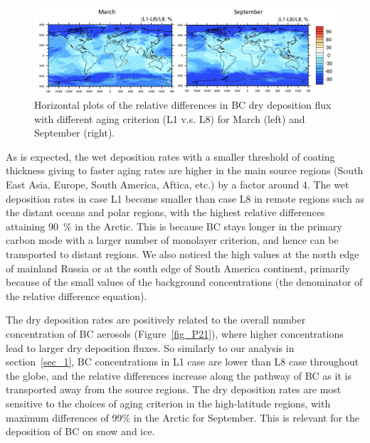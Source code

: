 \documentclass[12pt, fullpage]{uiucthesis2009_2}
\begin{document}
	
	\begin{figure}[h] 
		\begin{center}
			\includegraphics[width = 1\textwidth]{Figure18}
			\caption[Horizontal plots of the relative differences in BC dry deposition flux with different aging criterion (L1 v.s. L8) for March (left) and September (right)]{\label{fig_P18} Horizontal plots of the relative differences in BC dry deposition flux with different aging criterion (L1 v.s. L8) for March (left) and September (right).}
		\end{center}
	\end{figure}
	
	As is expected, the wet deposition rates with a smaller threshold of coating thickness giving to faster aging rates are higher in the main source regions (South East Asia, Europe, South America, Aftica, etc.) by a factor around 4. The wet deposition rates in case L1 become smaller than case L8 in remote regions such as the distant oceans and polar regions, with the highest relative differences attaining 90~$\%$ in the Arctic. This is because BC stays longer in the primary carbon mode with a larger number of monolayer criterion, and hence can be transported to distant regions. We also noticed the high values at the north edge of mainland Russia or at the south edge of South America continent, primarily because of the small values of the background concentrations (the denominator of the relative difference equation).
	
	The dry deposition rates are positively related to the overall number concentration of BC aerosols (Figure~\ref{fig_P21}), where higher concentrations lead to larger dry deposition fluxes. So similarly to our analysis in section~\ref{sec_1}, BC concentrations in L1 case are lower than L8 case throughout the globe, and the relative differences increase along the pathway of BC as it is transported away from the source regions. The dry deposition rates are most sensitive to the choices of aging criterion in the high-latitude regions, with maximum differences of 99$\%$ in the Arctic for September. This is relevant for the deposition of BC on snow and ice.
	
\end{document}
